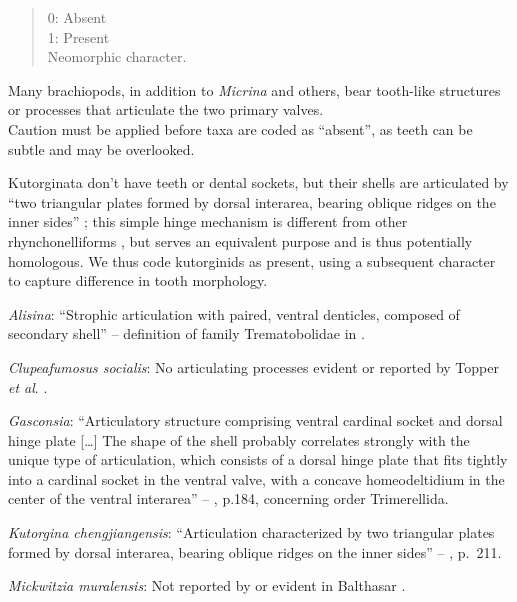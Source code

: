 \documentclass[openany]{book}
\theoremstyle{definition}
\theoremstyle{definition}
\theoremstyle{definition}
\theoremstyle{remark}
\begin{document}
\begin{quote}
0: Absent\\
1: Present\\
Neomorphic character.
\end{quote}

Many brachiopods, in addition to \emph{Micrina} and others, bear
tooth-like structures or processes that articulate the two primary
valves.\\
Caution must be applied before taxa are coded as ``absent'', as teeth
can be subtle and may be overlooked.

Kutorginata don't have teeth or dental sockets, but their shells are
articulated by ``two triangular plates formed by dorsal interarea,
bearing oblique ridges on the inner sides''
\citep[p.~211]{Williams2000LinguliformeaCraniiformea}; this simple hinge
mechanism is different from other rhynchonelliforms
\citep[p.208]{Williams2000LinguliformeaCraniiformea}, but serves an
equivalent purpose and is thus potentially homologous. We thus code
kutorginids as present, using a subsequent character to capture
difference in tooth morphology.

\hypertarget{Alisina-coding-5}{}
\emph{Alisina}: ``Strophic articulation with paired, ventral denticles,
composed of secondary shell'' -- definition of family Trematobolidae in
\citet{Williams2000LinguliformeaCraniiformea}.

\hypertarget{Clupeafumosus_socialis-coding-5}{}
\emph{Clupeafumosus socialis}: No articulating processes evident or
reported by Topper \emph{et al}. \citeyearpar{Topper2013Reappraisalof}.

\hypertarget{Gasconsia-coding-5}{}
\emph{Gasconsia}: ``Articulatory structure comprising ventral cardinal
socket and dorsal hinge plate {[}\ldots{}{]} The shape of the shell
probably correlates strongly with the unique type of articulation, which
consists of a dorsal hinge plate that fits tightly into a cardinal
socket in the ventral valve, with a concave homeodeltidium in the center
of the ventral interarea'' --
\citet{Williams2000LinguliformeaCraniiformea}, p.184, concerning order
Trimerellida.

\hypertarget{Kutorgina_chengjiangensis-coding-5}{}
\emph{Kutorgina chengjiangensis}: ``Articulation characterized by two
triangular plates formed by dorsal interarea, bearing oblique ridges on
the inner sides'' -- \citet{Williams2000LinguliformeaCraniiformea},
p.~211.

\hypertarget{Mickwitzia_muralensis-coding-5}{}
\emph{Mickwitzia muralensis}: Not reported by or evident in Balthasar
\citeyearpar{Balthasar2004Shellstructure}.
\end{document}
